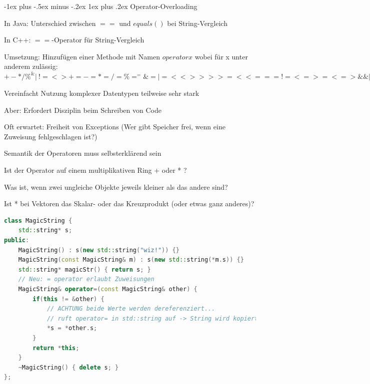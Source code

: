 \documentclass[10pt]{article}
\makeatletter
\renewcommand{\subsubsection}{\@startsection{subsubsection}{3}{0mm}%
                                {-1ex plus -.5ex minus -.2ex}%
                                {1ex plus .2ex}%
                                {\normalfont\small\bfseries}}
\makeatother
\begin{document}
\subsubsection{Operator-Overloading}
\begin{itemize*}
  \item In Java: Unterschied zwischen $==$ und $equals()$ bei String-Vergleich
  \item In C++: $==$-Operator für String-Vergleich
  \item Umsetzung: Hinzufügen einer Methode mit Namen $operator x$ wobei für x unter anderem zulässig: $+ - * / \% ^ \& | ~ ! = < > += -= *= /= \%= ^= \&= |= << >> >>= <<= == != <= >= <=> \&\& || ++ -- , ->* -> () []$
  \item Vereinfacht Nutzung komplexer Datentypen teilweise sehr stark
  \item Aber: Erfordert Disziplin beim Schreiben von Code
  \begin{itemize*}
    \item Oft erwartet: Freiheit von Exceptions (Wer gibt Speicher frei, wenn eine Zuweisung fehlgeschlagen ist?)
    \item Semantik der Operatoren muss selbsterklärend sein
    \begin{itemize*}
      \item Ist der Operator auf einem multiplikativen Ring + oder * ?
      \item Was ist, wenn zwei ungleiche Objekte jeweils kleiner als das andere sind?
      \item Ist * bei Vektoren das Skalar- oder das Kreuzprodukt (oder etwas ganz anderes)?
    \end{itemize*}
  \end{itemize*}
\end{itemize*}

\begin{lstlisting}[language=C++]
class MagicString {
    std::string* s;
public:
    MagicString() : s(new std::string("wiz!")) {}
    MagicString(const MagicString& m) : s(new std::string(*m.s)) {}
    std::string* magicStr() { return s; }
    // Neu: = operator erlaubt Zuweisungen
    MagicString& operator=(const MagicString& other) {
        if(this != &other) {
            // ACHTUNG beide Werte werden dereferenziert...
            // ruft operator= in std::string auf -> String wird kopiert
            *s = *other.s;
        }
        return *this;
    }
    ~MagicString() { delete s; }
};
\end{lstlisting}
\end{document}
